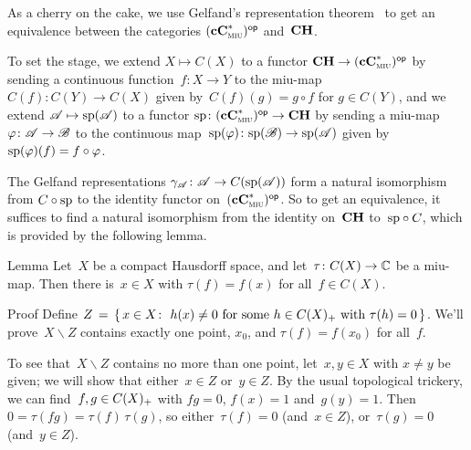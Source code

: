 \documentclass[a]{subfiles}
\begin{document}
\begin{parsec}%
\begin{point}%
As a cherry on the cake,
we use Gelfand's representation theorem~
to get an equivalence between the categories ${(\mathbf{cC}^*_{\text{\textsc{miu}}})}{^{\mathsf{op}}}$
and~$\mathbf{CH}$.

To set the stage,
we extend $X\mapsto C(X)$ to a functor
$\mathbf{CH}\to {(\mathbf{cC}^*_{\text{\textsc{miu}}})}{^{\mathsf{op}}}$
by sending a continuous function~$f\colon X\to Y$
to the miu-map $C(f)\colon C(Y)\to C(X)$
given by~$C(f)(g)=g\circ f$ for $g\in C(Y)$,
and we extend $\mathscr{A}\mapsto \mathrm{sp}(\mathscr{A})$
to a functor $\mathrm{sp}\colon {(\mathbf{cC}^*_{\text{\textsc{miu}}})}{^{\mathsf{op}}}\to \mathbf{CH}$
by sending a miu-map $\varphi \colon \mathscr{A}\to\mathscr{B}$
to the continuous map~$\mathrm{sp}(\varphi)\colon \mathrm{sp}(\mathscr{B})\to\mathrm{sp}(\mathscr{A})$
given by~$\mathrm{sp}(\varphi)(f)=f\circ \varphi$.

The Gelfand representations $\gamma_{\mathscr{A}}\colon \mathscr{A}\to C(\mathrm{sp}(\mathscr{A}))$
form a natural isomorphism
from $C\circ \mathrm{sp}$ to the identity functor on~${(\mathbf{cC}^*_{\text{\textsc{miu}}})}{^{\mathsf{op}}}$.
So to get an equivalence,
it suffices to find a natural isomorphism
from the identity on~$\mathbf{CH}$ to~$\mathrm{sp}\circ C$,
which is provided by the following lemma.
\end{point}
\begin{point}{Lemma}%
Let~$X$ be a compact Hausdorff space,
and let~$\tau \colon C(X)\to \mathbb{C}$ be a miu-map.
Then there is~$x\in X$ with $\tau(f)=f (x)$
for all~$f\in C(X)$.
\begin{point}{Proof}%
Define
$Z\,= \, \{\,x\in X\colon \ h(x)\neq 0\text{ for some~$h\in C(X)_{+}$
with $\tau(h)=0$}\,\}$.
We'll prove~$X\backslash Z$ contains
exactly one point, $x_0$, and $\tau(f)=f(x_0)$ for all~$f$.
\begin{point}%
To see that~$X\backslash Z$ contains no more than one point,
let~$x,y\in X$ with $x\neq y$ be given;
we will show that either~$x\in Z$ or~$y\in Z$.
By the usual topological trickery,
we can find~$f,g\in C(X)_{+}$
with $fg=0$, $f(x)=1$ and~$g(y)=1$.
Then~$0=\tau(fg)=\tau(f)\,\tau(g)$,
so either~$\tau(f)=0$ (and~$x\in Z$), or~$\tau(g)=0$
(and~$y\in Z$).


\end{point}
\end{point}
\end{point}
\end{parsec}
\end{document}

